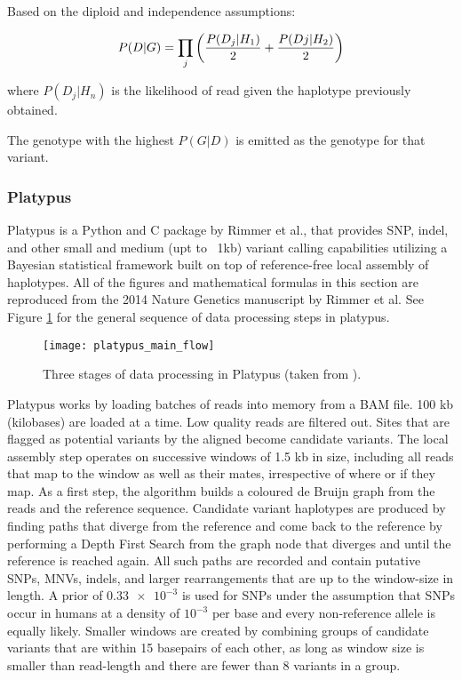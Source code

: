 Based on the diploid and independence assumptions:

\begin{equation}
    \label{eq:gatk_genotype_likelihood}
    P(D|G) = \prod_j{\bigg({P(D_j|H_1)\over 2} + {P(Dj|H_2)\over 2}\bigg)}
\end{equation}

where $P(D_j|H_n)$ is the likelihood of read given the haplotype previously obtained.

The genotype with the highest $P(G|D)$ is emitted as the genotype for that variant.

\subsubsection{Platypus}
Platypus\autocite{rimmer2014integrating} is a Python and C package by Rimmer et al., that provides SNP, indel, and other small and medium (upt to ~1kb) variant calling capabilities utilizing a Bayesian statistical framework built on top of reference-free local assembly of haplotypes. All of the figures and mathematical formulas in this section are reproduced from the 2014 Nature Genetics manuscript by Rimmer et al. See Figure \ref{fig:platypus_main_flow} for the general sequence of data processing steps in platypus.

\begin{figure}[h!]
    \texttt{[image: platypus\_main\_flow]}
    \centering
    \caption {Three stages of data processing in Platypus (taken from \autocite{rimmer2014integrating}).}
    \label{fig:platypus_main_flow}
    \end{figure}


Platypus works by loading batches of reads into memory from a BAM file. 100 kb (kilobases) are loaded at a time. Low quality reads are filtered out. Sites that are flagged as potential variants by the aligned become candidate variants. The local assembly step operates on successive windows of 1.5 kb in size, including all reads that map to the window as well as their mates, irrespective of where or if they map. As a first step, the algorithm builds a coloured de Bruijn graph\autocite{iqbal2012novo} from the reads and the reference sequence. Candidate variant haplotypes are produced by finding paths that diverge from the reference and come back to the reference by performing a Depth First Search from the graph node that diverges and until the reference is reached again. All such paths are recorded and contain putative SNPs, MNVs, indels, and larger rearrangements that are up to the window-size in length. A prior of $\num{0.33e-3}$ is used for SNPs under the assumption that SNPs occur in humans at a density of $10^{-3}$ per base and every non-reference allele is equally likely. Smaller windows are created by combining groups of candidate variants that are within 15 basepairs of each other, as long as window size is smaller than read-length and there are fewer than 8 variants in a group.

